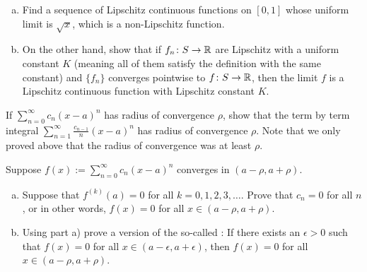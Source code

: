 \begin{exercise}
\leavevmode
\begin{enumerate}[a)]
\item
Find a sequence of Lipschitz continuous functions on $[0,1]$
whose uniform limit is $\sqrt{x}$, which is a non-Lipschitz function.
\item
On the other hand, show that if $f_n \colon S \to {\mathbb{R}}$ are Lipschitz
with a uniform constant $K$ (meaning all of them satisfy the definition
with the same constant) and $\{ f_n \}$ converges pointwise
to $f \colon S \to {\mathbb{R}}$,
then the limit $f$ is a Lipschitz continuous function
with Lipschitz constant $K$.
\end{enumerate}
\end{exercise}

\begin{exercise}
If $\sum_{n=0}^\infty c_n {(x-a)}^n$ has radius of convergence $\rho$,
show that the term by term integral
$\sum_{n=1}^\infty \frac{c_{n-1}}{n} {(x-a)}^n$ has radius of convergence
$\rho$.  Note that we only proved above that the radius of convergence was
at least $\rho$.
\end{exercise}

\begin{exercise}
Suppose $f(x) := \sum_{n=0}^\infty c_n {(x-a)}^n$ converges in $(a-\rho,a+\rho)$.
\begin{enumerate}[a)]
\item
Suppose that $f^{(k)}(a) = 0$ for all $k=0,1,2,3,\ldots$.  Prove that
$c_n = 0$ for all $n$, or in other words, 
$f(x) = 0$ for all $x \in (a-\rho,a+\rho)$.
\item
Using part a) prove a version of the so-called :  If there exists an $\epsilon > 0$
such that $f(x) = 0$ for all $x \in (a-\epsilon, a+\epsilon)$, then
$f(x) = 0$ for all $x \in (a-\rho,a+\rho)$.
\end{enumerate}
\end{exercise}

